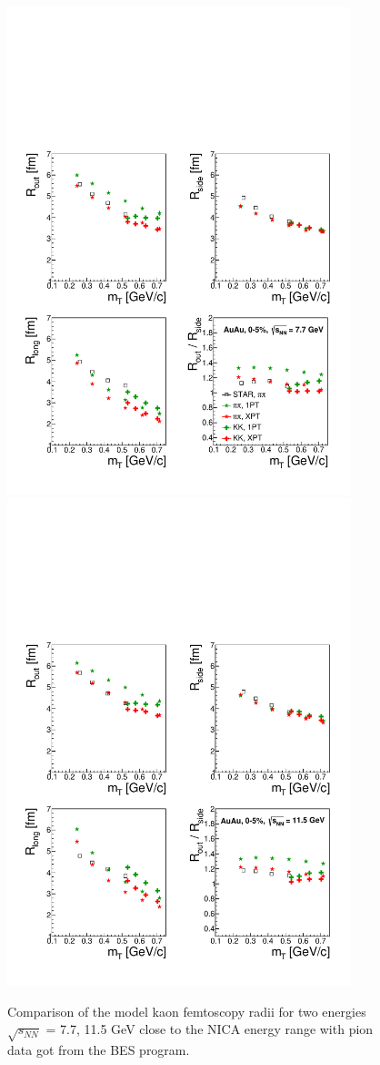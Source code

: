 \documentclass[a4paper]{panl}
\begin{document}
\begin{figure}[t]
  \begin{center}
     \includegraphics[width=100mm]{fig5a.pdf}
     \includegraphics[width=100mm]{fig5b.pdf}
\vspace{-3mm}
\caption{Comparison of the model kaon femtoscopy radii for two energies $\sqrt{s_{NN}}$ = 7.7, 11.5 GeV close to the NICA energy range
  with pion data got from the BES program.}
\end{center}
\vspace{-5mm}
\end{figure}
\end{document}
